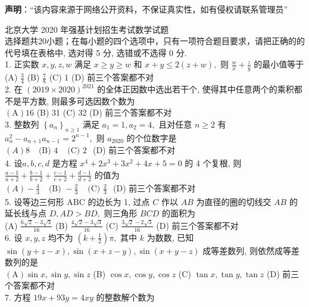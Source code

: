 

\textbf{声明}：“该内容来源于网络公开资料，不保证真实性，如有侵权请联系管理员”

北京大学 2020 年强基计划招生考试数学试题\\
选择题共20小题；在每小题的四个选项中，只有一项符合题目要求，请把正确的的代号填在表格中, 选对得 5 分, 选错或不选得 0 分.\\
1. 正实数 $x, y, z, w$ 满足 $x \geq y \geq w$ 和 $x+y \leq 2(z+w),$ 则 $\frac{w}{x}+\frac{z}{y}$ 的最小值等于\\
(A) $\frac{3}{4}$
(B) $\frac{7}{8}$
(C) 1
(D) 前三个答案都不对\\
2. 在 $(2019 \times 2020)^{2021}$ 的全体正因数中选出若干个, 使得其中任意两个的乘积都不是平方数, 则最多可选因数个数为\\
$(\mathrm{A}) 16$
(B) 31
(C) 32
(D) 前三个答案都不对\\
3. 整数列 $\left\{a_{n}\right\}_{n \geq 1}$ 满足 $a_{1}=1, a_{2}=4,$ 且对任意 $n \geq 2$ 有 $a_{n}^{2}-a_{n+1} a_{n-1}=2^{n-1},$ 则 $a_{2020}$ 的个位数字是\\
$(A) 8$
$\begin{array}{ll}\text { (B) } 4 & \text { (C) } 2\end{array}$
(D) 前三个答案都不对\\
4. 设$a, b, c, d$ 是方程 $x^{4}+2 x^{3}+3 x^{2}+4 x+5=0$ 的 4 个复根, 则 $\frac{a-1}{a+2}+\frac{b-1}{b+2}+\frac{c-1}{c+2}+\frac{d-1}{d+2}$
的值为\\
$(A)-\frac{4}{3}$
$\begin{array}{ll}\text { (B) }-\frac{2}{3} & \text { (C) } \frac{2}{3}\end{array}$
(D) 前三个答案都不对\\
5. 设等边三何形 ABC 的边长为 1, 过点 $C$ 作以 $A B$ 为直径的圈的切线交 $A B$ 的延长线与点 $D, A D>B D,$ 则三角形 $B C D$ 的面积为\\
(A) $\frac{6 \sqrt{2}-3 \sqrt{3}}{16}$
(B) $\frac{4 \sqrt{2}-3 \sqrt{3}}{16}$
(C) $\frac{3 \sqrt{2}-2 \sqrt{3}}{16}$
(D) 前三个答案都不对\\
6. 设 $x, y, z$ 均不为 $\left(k+\frac{1}{2}\right) \pi,$ 其中 $k$ 为数数, 已知$\sin (y+z-x), \sin (x+z-y), \sin (x+
y-z )$ 成等差数列, 则依然成等差数列的是\\
$(\mathrm{A}) \sin x, \sin y, \sin z$
(B) $\cos x, \cos y, \cos z$
(C) $\tan x, \tan y, \tan z$
(D) 前三个答案都不对\\
7. 方程 $19 x+93 y=4 x y$ 的整数解个数为\\
